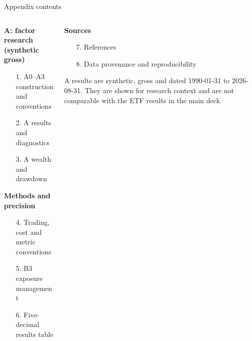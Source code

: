 \documentclass[aspectratio=169,11pt]{beamer}
\begin{document}
\appendix
\begin{frame}[t]{Appendix contents}
\small
\begin{columns}[T,onlytextwidth]
\begin{column}{0.48\textwidth}
\textbf{A: factor research (synthetic gross)}
\begin{enumerate}
\item[\color{accent}1.] A0--A3 construction and conventions
\item[\color{accent}2.] A results and diagnostics
\item[\color{accent}3.] A wealth and drawdown
\end{enumerate}
\vskip0.2cm
\textbf{Methods and precision}
\begin{enumerate}
\item[\color{accent}4.] Trading, cost and metric conventions
\item[\color{accent}5.] B3 exposure management
\item[\color{accent}6.] Five-decimal results table
\end{enumerate}
\end{column}
\begin{column}{0.48\textwidth}
\textbf{Sources}
\begin{enumerate}
\item[\color{accent}7.] References
\item[\color{accent}8.] Data provenance and reproducibility
\end{enumerate}
\vskip0.3cm
\footnotesize\color{muted}
A results are synthetic, gross and dated 1990-01-31 to 2026-08-31. They are shown for research context and are not comparable with the ETF results in the main deck.
\end{column}
\end{columns}
\end{frame}
\end{document}
